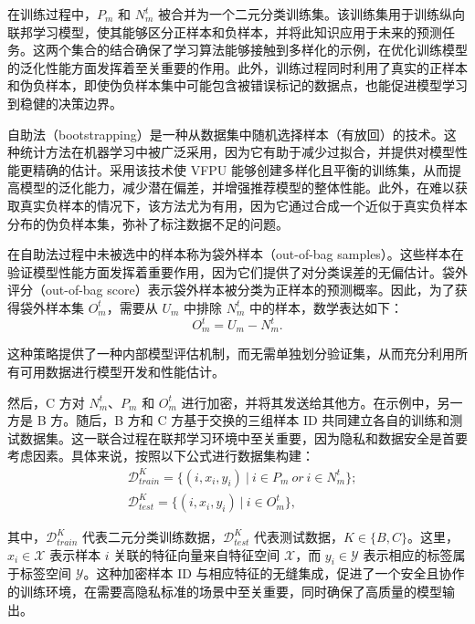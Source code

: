 在训练过程中，$P_{m}$ 和 $N_{m}^{t}$ 被合并为一个二元分类训练集。该训练集用于训练纵向联邦学习模型，使其能够区分正样本和负样本，并将此知识应用于未来的预测任务。这两个集合的结合确保了学习算法能够接触到多样化的示例，在优化训练模型的泛化性能方面发挥着至关重要的作用。此外，训练过程同时利用了真实的正样本和伪负样本，即使伪负样本集中可能包含被错误标记的数据点，也能促进模型学习到稳健的决策边界。

自助法（bootstrapping）是一种从数据集中随机选择样本（有放回）的技术。这种统计方法在机器学习中被广泛采用，因为它有助于减少过拟合，并提供对模型性能更精确的估计。采用该技术使 VFPU 能够创建多样化且平衡的训练集，从而提高模型的泛化能力，减少潜在偏差，并增强推荐模型的整体性能。此外，在难以获取真实负样本的情况下，该方法尤为有用，因为它通过合成一个近似于真实负样本分布的伪负样本集，弥补了标注数据不足的问题。

在自助法过程中未被选中的样本称为袋外样本（out-of-bag samples）。这些样本在验证模型性能方面发挥着重要作用，因为它们提供了对分类误差的无偏估计。袋外评分（out-of-bag score）表示袋外样本被分类为正样本的预测概率。因此，为了获得袋外样本集 $O_{m}^{t}$，需要从 $U_{m}$ 中排除 $N_{m}^{t}$ 中的样本，数学表达如下：
\begin{equation}
	O_{m}^{t}=U_{m}-N_{m}^{t}.
\end{equation}

这种策略提供了一种内部模型评估机制，而无需单独划分验证集，从而充分利用所有可用数据进行模型开发和性能估计。

然后，C 方对 $N_{m}^{t}$、$P_{m}$ 和 $O_{m}^{t}$ 进行加密，并将其发送给其他方。在示例中，另一方是 B 方。随后，B 方和 C 方基于交换的三组样本 ID 共同建立各自的训练和测试数据集。这一联合过程在联邦学习环境中至关重要，因为隐私和数据安全是首要考虑因素。具体来说，按照以下公式进行数据集构建：
\begin{equation}
	\begin{split}
		&\mathsf{\mathcal{D}}_{train}^{K}=\{(i,x_{i},y_{i}) \ | \ i\in P_{m}\ or\ i\in N_{m}^{t}\};\\
		&\mathsf{\mathcal{D}}_{test}^{K}=\{(i,x_{i},y_{i}) \ | \ i\in O_{m}^{t}\},
	\end{split}
\end{equation}

其中，$\mathsf{\mathcal{D}}_{train}^{K}$ 代表二元分类训练数据，$\mathsf{\mathcal{D}}_{test}^{K}$ 代表测试数据，$K\in \{B,C\}$。这里，$x_{i}\in \mathsf{\mathcal{X}}$ 表示样本 $i$ 关联的特征向量来自特征空间 $\mathsf{\mathcal{X}}$，而 $y_{i}\in \mathsf{\mathcal{Y}}$ 表示相应的标签属于标签空间 $\mathsf{\mathcal{Y}}$。这种加密样本 ID 与相应特征的无缝集成，促进了一个安全且协作的训练环境，在需要高隐私标准的场景中至关重要，同时确保了高质量的模型输出。

